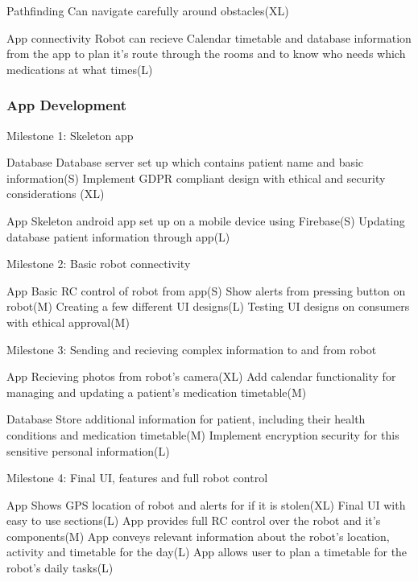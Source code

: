 \documentclass{article}
\begin{document}
Pathfinding
    Can navigate carefully around obstacles(XL)       
    
App connectivity 
    Robot can recieve Calendar timetable and database information from the app to plan it's route through the rooms and to know who         needs which medications at what times(L)
    
\subsubsection{App Development}

Milestone 1: Skeleton app

Database
    Database server set up which contains patient name and basic information(S)
    Implement GDPR compliant design with ethical and security considerations (XL)
    
App
    Skeleton android app set up on a mobile device using Firebase(S)
    Updating database patient information through app(L)
    
Milestone 2: Basic robot connectivity

App
    Basic RC control of robot from app(S)
    Show alerts from pressing button on robot(M)
    Creating a few different UI designs(L)
    Testing UI designs on consumers with ethical approval(M)
    
Milestone 3: Sending and recieving complex information to and from robot

App
    Recieving photos from robot's camera(XL)
    Add calendar functionality for managing and updating a patient's medication timetable(M)

Database
    Store additional information for patient, including their health conditions and medication timetable(M)
    Implement encryption security for this sensitive personal information(L)

Milestone 4: Final UI, features and full robot control

App
    Shows GPS location of robot and alerts for if it is stolen(XL)
    Final UI with easy to use sections(L)
    App provides full RC control over the robot and it's components(M)
    App conveys relevant information about the robot's location, activity and timetable for the day(L)
    App allows user to plan a timetable for the robot's daily tasks(L)
   
    

\end{document}
